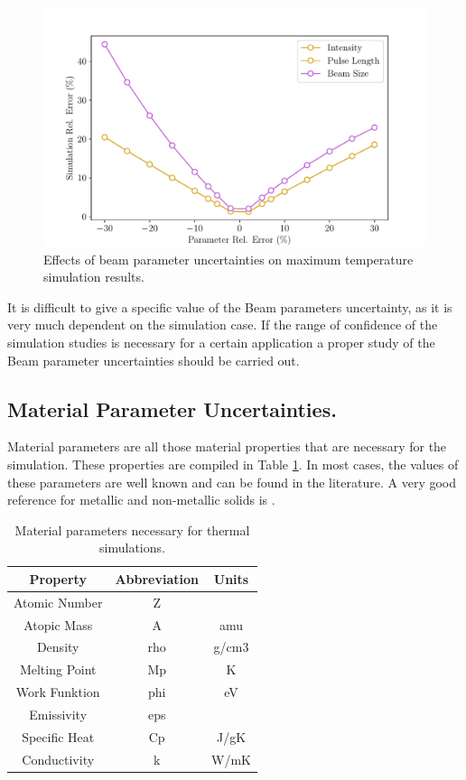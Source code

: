 \begin{figure}[h]
    \centering
    \includegraphics[width=0.7\columnwidth]{BeamParameterUncertainty/BeamParUnc.pdf}
    \caption{Effects of beam parameter uncertainties on maximum temperature simulation results.}
    \label{fig:BeamParUnc}
\end{figure}

It is difficult to give a specific value of the Beam parameters uncertainty, as it is very much dependent on the simulation case. If the range of confidence of the simulation studies is necessary for a certain application a proper study of the Beam parameter uncertainties should be carried out. 

\subsection{Material Parameter Uncertainties.}

Material parameters are all those material properties that are necessary for the simulation. These properties are compiled in Table \ref{tab:MaterialProp}. In most cases, the values of these parameters are well known and can be found in the literature. A very good reference for metallic and non-metallic solids is \parencite[][]{ref:MatProperties}.  

\begin{table}[h]
    \centering
    \begin{tabular}{ccc}
    \hline
    \textbf{Property} & \textbf{Abbreviation} & \textbf{Units} \\ \hline
    Atomic Number     & Z                     &                \\
    Atopic Mass       & A                     & amu            \\
    Density           & rho                   & g/cm3          \\
    Melting Point     & Mp                    & K              \\
    Work Funktion     & phi                   & eV             \\
    Emissivity        & eps                   &                \\
    Specific Heat     & Cp                    & J/gK           \\
    Conductivity      & k                     & W/mK           \\ \hline
    \end{tabular}
    \caption{Material parameters necessary for thermal simulations.}
    \label{tab:MaterialProp}
    \end{table}

